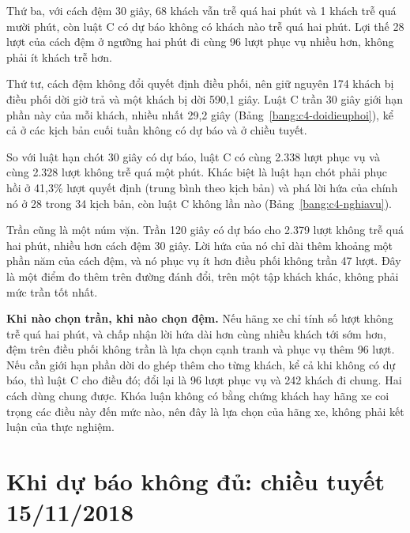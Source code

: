 Thứ ba, với cách đệm 30 giây, 68 khách vẫn trễ quá hai phút và 1 khách trễ quá mười phút, còn luật C có dự báo không
có khách nào trễ quá hai phút. Lợi thế 28 lượt của cách đệm ở ngưỡng hai phút đi cùng 96 lượt phục vụ nhiều hơn,
không phải ít khách trễ hơn.

Thứ tư, cách đệm không đổi quyết định điều phối, nên giữ nguyên 174 khách bị điều phối dời giờ trả và một khách bị
dời 590,1 giây. Luật C trần 30 giây giới hạn phần này của mỗi khách, nhiều nhất 29,2 giây
(Bảng~\ref{bang:c4-doidieuphoi}), kể cả ở các kịch bản cuối tuần không có dự báo và ở chiều tuyết.

So với luật hạn chót 30 giây có dự báo, luật C có cùng 2.338 lượt phục vụ và cùng 2.328 lượt không trễ quá một phút.
Khác biệt là luật hạn chót phải phục hồi ở 41,3\% lượt quyết định (trung bình theo kịch bản) và phá lời hứa của chính
nó ở 28 trong 34 kịch bản, còn luật C không lần nào (Bảng~\ref{bang:c4-nghiavu}).

Trần cũng là một núm vặn. Trần 120 giây có dự báo cho 2.379 lượt không trễ quá hai phút, nhiều hơn cách đệm 30 giây.
Lời hứa của nó chỉ dài thêm khoảng một phần năm của cách đệm, và nó phục vụ ít hơn điều phối không trần 47 lượt. Đây
là một điểm đo thêm trên đường đánh đổi, trên một tập khách khác, không phải mức trần tốt nhất.

\textbf{Khi nào chọn trần, khi nào chọn đệm.} Nếu hãng xe chỉ tính số lượt không trễ quá hai phút, và chấp nhận lời
hứa dài hơn cùng nhiều khách tới sớm hơn, đệm trên điều phối không trần là lựa chọn cạnh tranh và phục vụ thêm 96
lượt. Nếu cần giới hạn phần dời do ghép thêm cho từng khách, kể cả khi không có dự báo, thì luật C cho điều đó; đổi
lại là 96 lượt phục vụ và 242 khách đi chung. Hai cách dùng chung được. Khóa luận không có bằng chứng khách hay hãng
xe coi trọng các điều này đến mức nào, nên đây là lựa chọn của hãng xe, không phải kết luận của thực nghiệm.

\section{Khi dự báo không đủ: chiều tuyết 15/11/2018}
\label{muc:c4-tuyet}

